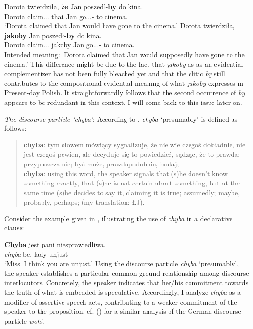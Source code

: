 \documentclass[output=paper
,modfonts
,nonflat]{langsci/langscibook}
\begin{document}
 \ea \ea \gll	Dorota twierdziła, \textbf{że} Jan poszedł-\textbf{by} do kina. \\
 		Dorota claim.{\lptcp}.{\sg}.{\fem} that Jan go.{\lptcp}.{\sg}.{\masc}-{\subj} to cinema.{\gen} \\
		\glt`Dorota claimed that Jan would have gone to the cinema.' 
		\ex\gll		*Dorota twierdziła, \textbf{jakoby} Jan poszedł-\textbf{by} do kina. \\
 			Dorota claim.{\lptcp}.{\sg}.{\fem} jakoby Jan go.{\lptcp}.{\sg}.{\masc}-{\subj} to cinema.{\gen} \\
		\glt Intended meaning: `Dorota claimed that Jan would supposedly have gone to the cinema.' 	
\z\z
This difference might be due to the fact that \emph{jakoby} as as an evidential complementizer has not been fully bleached yet and that the clitic \emph{by} still contributes to the compositional evidential meaning of what \emph{jakoby} expresses in Present-day Polish. It straightforwardly follows that the second occurrence of \emph{by} appears to be redundant in this context. I will come back to this issue later on. 

\emph{The discourse particle `chyba'}: According to \textcite{SWJP1998}, \emph{chyba} `presumably' is defined as follows:

\begin{quote}
\textbf{chyba}: tym słowem mówiący sygnalizuje, że nie wie czegoś dokładnie, nie jest czegoś pewien, ale decyduje się to powiedzieć, sądząc, że to prawda; przypuszczalnie; być może, prawdopodobnie, bodaj; \\ \textbf{chyba}: using this word, the speaker signals that (s)he doesn't know something exactly, that (s)he is not certain about something, but at the same time (s)he decides to say it, claiming it is true; assumedly; maybe, probably, perhaps;  (my translation: ŁJ).  \newline \textcite[117]{SWJP1998}
\end{quote}

\noindent Consider the example given in , illustrating the use of \emph{chyba} in a declarative clause:

\ea \gll \textbf{Chyba} jest pani niesprawiedliwa. \label{chyba} \\
		\emph{chyba} be.{\thirdperson}{\sg} lady unjust \\
\glt	`Miss, I think you are unjust.' 
\z
Using the discourse particle \emph{chyba} `presumably', the speaker establishes a particular common ground relationship among discourse interlocutors. Concretely, the speaker indicates that her\slash his commitment towards the truth of what is embedded is speculative. Accordingly, I analyze \emph{chyba} as a modifier of assertive speech acts, contributing to a weaker commitment of the speaker to the proposition, cf. \citeauthor{Zimmermann2004} (\citeyear{Zimmermann2004, Zimmermann2011a})  for a similar analysis of the German discourse particle \emph{wohl}.
\end{document}
